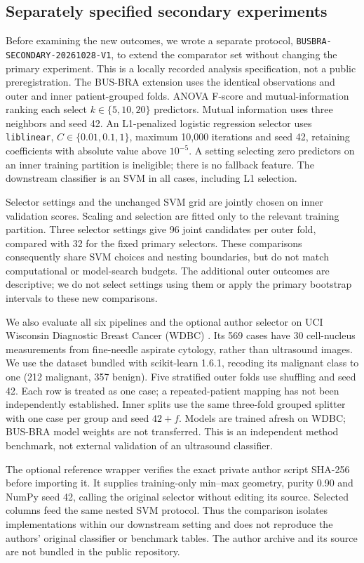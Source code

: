 \documentclass[11pt,a4paper]{article}
\begin{document}
\subsection{Separately specified secondary experiments}\label{sec:secondary}
Before examining the new outcomes, we wrote a separate protocol, \texttt{BUSBRA-SECONDARY-}\allowbreak\texttt{20261028-V1}, to extend the comparator set without changing the primary experiment. This is a locally recorded analysis specification, not a public preregistration. The BUS-BRA extension uses the identical observations and outer and inner patient-grouped folds. ANOVA F-score and mutual-information ranking each select $k\in\{5,10,20\}$ predictors. Mutual information uses three neighbors and seed 42. An L1-penalized logistic regression selector uses \texttt{liblinear}, $C\in\{0.01,0.1,1\}$, maximum 10,000 iterations and seed 42, retaining coefficients with absolute value above $10^{-5}$. A setting selecting zero predictors on an inner training partition is ineligible; there is no fallback feature. The downstream classifier is an SVM in all cases, including L1 selection.

Selector settings and the unchanged SVM grid are jointly chosen on inner validation scores. Scaling and selection are fitted only to the relevant training partition. Three selector settings give 96 joint candidates per outer fold, compared with 32 for the fixed primary selectors. These comparisons consequently share SVM choices and nesting boundaries, but do not match computational or model-search budgets. The additional outer outcomes are descriptive; we do not select settings using them or apply the primary bootstrap intervals to these new comparisons.

We also evaluate all six pipelines and the optional author selector on UCI Wisconsin Diagnostic Breast Cancer (WDBC) \cite{wdbc}. Its 569 cases have 30 cell-nucleus measurements from fine-needle aspirate cytology, rather than ultrasound images. We use the dataset bundled with scikit-learn 1.6.1, recoding its malignant class to one (212 malignant, 357 benign). Five stratified outer folds use shuffling and seed 42. Each row is treated as one case; a repeated-patient mapping has not been independently established. Inner splits use the same three-fold grouped splitter with one case per group and seed $42+f$. Models are trained afresh on WDBC; BUS-BRA model weights are not transferred. This is an independent method benchmark, not external validation of an ultrasound classifier.

The optional reference wrapper verifies the exact private author script SHA-256 before importing it. It supplies training-only min--max geometry, purity 0.90 and NumPy seed 42, calling the original selector without editing its source. Selected columns feed the same nested SVM protocol. Thus the comparison isolates implementations within our downstream setting and does not reproduce the authors' original classifier or benchmark tables. The author archive and its source are not bundled in the public repository.
\end{document}
